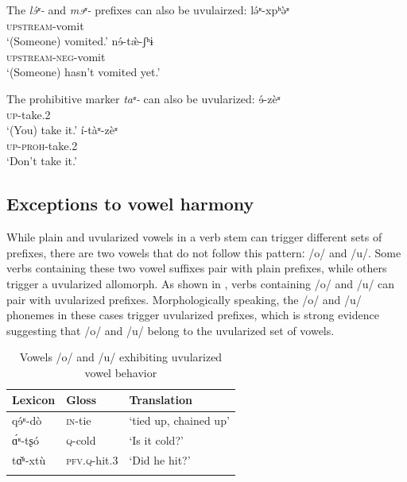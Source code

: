 \documentclass[output=paper]{langscibook}
\begin{document}
\ea%
The \textit{lɘ́ʶ-} and \textit{mɘʶ-} prefixes can also be uvulairzed: 
    \label{ex:guan:10}
    \ea \label{ex:guan:10a}
        \gll lə́ʶ-xpʰə̀ʶ\\
        \textsc{upstream}{}-vomit\\
        \glt  ‘(Someone) vomited.’        
    \ex \label{ex:guan:10b}
        \gll nɘ́-tæ̀-ʃʰɨ\\
        \textsc{upstream}-\textsc{neg}-vomit\\
        \glt  ‘(Someone) hasn’t vomited yet.’
        \z
    \z
        
\ea%
The prohibitive marker \textit{taʶ-} can also be uvularized:
    \label{ex:guan:11}
    \ea \label{ex:guan:11a}
        \gll ɘ́-zèʶ\\
        \textsc{up}{}-take.2\\
        \glt  ‘(You) take it.’
    \ex \label{ex:guan:11b}
        \gll í-tàʶ-zèʶ\\
        \textsc{up}-\textsc{proh}-take.2\\
        \glt  ‘Don’t take it.’
        \z
    \z
        

\subsection{Exceptions to vowel harmony}\label{sec:guan:2.4}\largerpage

While plain and uvularized vowels in a verb stem can trigger different sets of prefixes, there are two vowels that do not follow this patternː /o/ and /u/. Some verbs containing these two vowel suffixes pair with plain prefixes, while others trigger a uvularized allomorph. As shown in , verbs containing /o/ and \mbox{/u/} can pair with uvularized prefixes. Morphologically speaking, the /o/ and /u/ phonemes in these cases trigger uvularized prefixes, which is strong evidence suggesting that /o/ and /u/ belong to the uvularized set of vowels.

\begin{table}
\caption{Vowels /o/ and /u/ exhibiting uvularized vowel behavior}
\label{tab:guan:8}
\begin{tabularx}{\textwidth}{XXl}
\lsptoprule
{Lexicon} & {Gloss} & {Translation}\\
\midrule
{qɘ́ʶ-dò } & {\textsc{in}{}-tie} & {‘tied up, chained up’}\\
{ɑ́ʶ-tʂó} & {\textsc{q}{}-cold} & {‘Is it cold?’}\\
{tɑ̌ʶ-xtù} & {\textsc{pfv.q}{}-hit.3} & {‘Did he hit?’}\\
\lspbottomrule
\end{tabularx}
\end{table}
\end{document}
